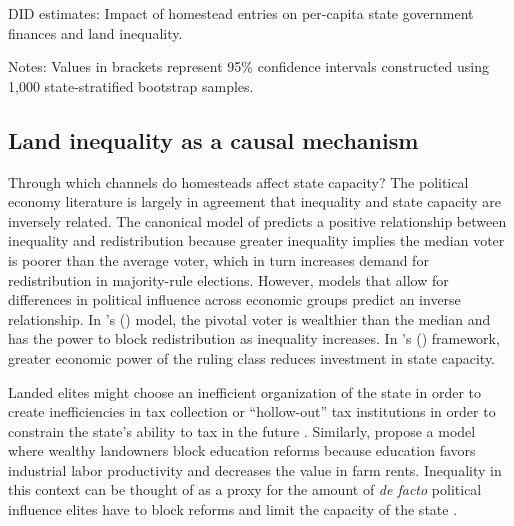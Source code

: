\documentclass[12pt]{article}
\newcommand{\possessivecite}[1]{\citeauthor{#1}'s (\citeyear{#1})}
\begin{document}
\begin{table}[htbp]
	\begin{center}
		\caption{DID estimates: Impact of homestead entries on per-capita state government finances and land inequality. \label{dd-estimates}}
		\resizebox{.8\width}{!}{}
	\end{center}
	\footnotesize{Notes: Values in brackets represent 95\% confidence intervals constructed using 1,000 state-stratified bootstrap samples.}
\end{table}

\subsection{Land inequality as a causal mechanism}  \label{mechanisms}

Through which channels do homesteads affect state capacity? The political economy literature is largely in agreement that inequality and state capacity are inversely related. The canonical model of \citet{meltzer1981rational} predicts a positive relationship between inequality and redistribution because greater inequality implies the median voter is poorer than the average voter, which in turn increases demand for redistribution in majority-rule elections. However, models that allow for differences in political influence across economic groups predict an inverse relationship. In \possessivecite{benabou2000unequal} model, the pivotal voter is wealthier than the median and has the power to block redistribution as inequality increases. In \possessivecite{besley2009origins} framework, greater economic power of the ruling class reduces investment in state capacity. 

Landed elites might choose an inefficient organization of the state in order to create inefficiencies in tax collection \citep{acemoglu2011emergence} or ``hollow-out'' tax institutions in order to constrain the state's ability to tax in the future \citep{suryanarayan2017hollowing}. Similarly, \citet{galor2009inequality} propose a model where wealthy landowners block education reforms because education favors industrial labor productivity and decreases the value in farm rents. Inequality in this context can be thought of as a proxy for the amount of \emph{de facto} political influence elites have to block reforms and limit the capacity of the state \citep{acemoglu2008persistence}. 
\end{document}
